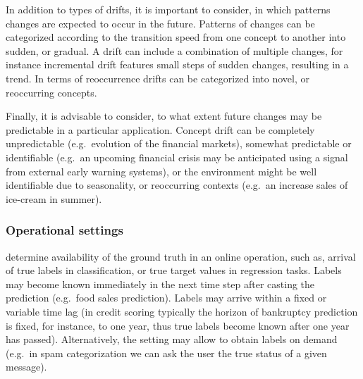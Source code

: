 \documentclass{llncs}
\begin{document}
In addition to types of drifts, it is important to consider, in which patterns changes are expected to occur in the future.
Patterns of changes can be categorized according to the transition speed from one concept to another into sudden, or gradual.
A drift can include a combination of multiple changes, for instance incremental drift features small steps of sudden changes, resulting in a trend.
In terms of reoccurrence drifts can be categorized into novel, or reoccurring concepts.

Finally, it is advisable to consider, to what extent future changes may be predictable in a particular application.
Concept drift can be completely unpredictable (e.g.\ evolution of the financial markets),
somewhat predictable or identifiable (e.g.\ an upcoming financial crisis may be anticipated using a signal from external early warning systems),
or the environment might be well identifiable due to seasonality, or reoccurring contexts (e.g.\ an increase sales of ice-cream in summer).

\subsubsection{Operational settings}
determine availability of the ground truth in an online operation, such as, arrival of true labels in classification, or true target values in regression tasks.
Labels may become known immediately in the next time step after casting the prediction (e.g.\ food sales prediction).
Labels may arrive within a fixed or variable time lag (in credit scoring typically the horizon of bankruptcy prediction is fixed, for instance,
to one year, thus true labels become known after one year has passed).
Alternatively, the setting may allow to obtain labels on demand (e.g.\ in spam categorization we can ask the user the true status of a given message).
\end{document}
